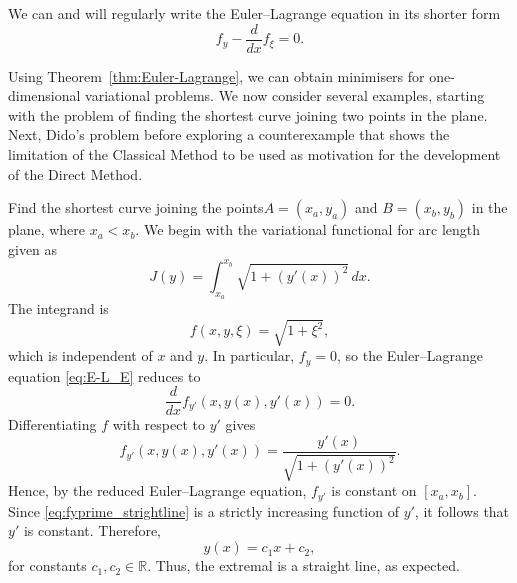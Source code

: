 We can and will regularly write the Euler--Lagrange equation in its shorter form
\[
f_y - \frac{d}{dx}f_{\xi} = 0.
\]

Using Theorem~\ref{thm:Euler-Lagrange}, we can obtain minimisers for one-dimensional variational problems. We now consider several examples, starting with the problem of finding the shortest curve joining two points in the plane. Next, Dido's problem before exploring a counterexample that shows the limitation of the Classical Method to be used as motivation for the development of the Direct Method. 

\begin{example}
\label{ex:straight-line}
Find the shortest curve joining the points$A=(x_a,y_a)$ and $B=(x_b,y_b)$ in the plane, where $x_a<x_b$. We begin with the variational functional for arc length given as
\[
J(y)=\int_{x_a}^{x_b}\sqrt{1+(y'(x))^2}\,dx.
\]
The integrand is
\[
f(x,y,\xi)=\sqrt{1+\xi^2},
\]
which is independent of $x$ and $y$. In particular,
$f_y=0$, so the Euler--Lagrange equation \eqref{eq:E-L_E} reduces to
\[
\frac{d}{dx}f_{y'}(x,y(x),y'(x))=0.
\]
Differentiating $f$ with respect to $y'$ gives
\begin{equation}
f_{y'}(x,y(x),y'(x))
=
\frac{y'(x)}{\sqrt{1+(y'(x))^2}}.
\label{eq:fyprime_strightline}
\end{equation}
Hence, by the reduced Euler--Lagrange equation, $f_{y'}$ is constant on $[x_a,x_b]$. Since \eqref{eq:fyprime_strightline}
is a strictly increasing function of $y'$, it follows that $y'$ is constant. Therefore,
\[
y(x)=c_1x+c_2,
\]
for constants $c_1,c_2\in\mathbb{R}$. Thus, the extremal is a straight line, as expected.
\end{example}


